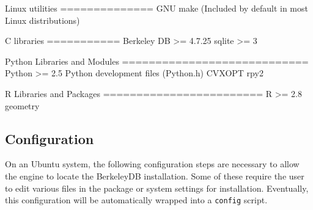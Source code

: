 \documentclass[10pt, letterpaper]{article}
\begin{document}
\begin{verbatimtab}
Linux utilities
==============
GNU make (Included by default in most Linux distributions)

C libraries
===========
Berkeley DB >= 4.7.25
sqlite >= 3

Python Libraries and Modules
============================
Python >= 2.5
Python development files (Python.h)
CVXOPT
rpy2

R Libraries and Packages
========================
R >= 2.8
geometry
\end{verbatimtab}

\subsection{Configuration}
On an Ubuntu system, the following configuration steps are necessary to allow the engine to
locate the BerkeleyDB installation.
Some of these require the user to edit various files in the package or
system settings for installation.
Eventually, this configuration will be automatically wrapped into a \texttt{config} script.
\end{document}
